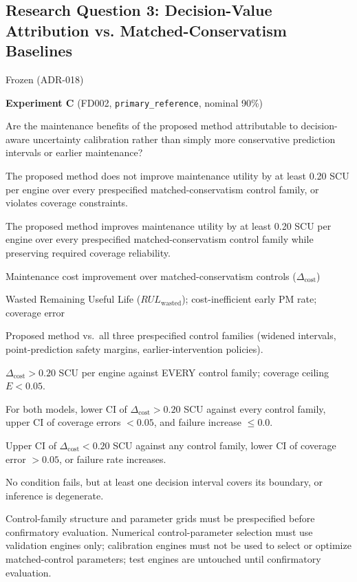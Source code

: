 \documentclass{article}
\begin{document}
\subsection*{Research Question 3: Decision-Value Attribution vs. Matched-Conservatism Baselines}
\begin{description}[style=multiline,leftmargin=3.5cm]
  \item[Status:] Frozen (ADR-018)
  \item[Experiment:] \textbf{Experiment C} (FD002, \texttt{primary\_reference}, nominal 90\%)
  \item[Question:] Are the maintenance benefits of the proposed method attributable to decision-aware uncertainty calibration rather than simply more conservative prediction intervals or earlier maintenance?
  \item[Null ($H_{0,3}$):] The proposed method does not improve maintenance utility by at least 0.20 SCU per engine over every prespecified matched-conservatism control family, or violates coverage constraints.
  \item[Alt ($H_{1,3}$):] The proposed method improves maintenance utility by at least 0.20 SCU per engine over every prespecified matched-conservatism control family while preserving required coverage reliability.
  \item[Primary Outcome:] Maintenance cost improvement over matched-conservatism controls ($\Delta_{\text{cost}}$)
  \item[Supporting Outcomes:] Wasted Remaining Useful Life ($RUL_{\text{wasted}}$); cost-inefficient early PM rate; coverage error
  \item[Comparison:] Proposed method vs.\ all three prespecified control families (widened intervals, point-prediction safety margins, earlier-intervention policies).
  \item[Threshold:] $\Delta_{\text{cost}} > 0.20$ SCU per engine against EVERY control family; coverage ceiling $E < 0.05$.
  \item[Supported Logic:] For both models, lower CI of $\Delta_{\text{cost}} > 0.20$ SCU against every control family, upper CI of coverage errors $< 0.05$, and failure increase $\le 0.0$.
  \item[Unsupported Logic:] Upper CI of $\Delta_{\text{cost}} < 0.20$ SCU against any control family, lower CI of coverage error $> 0.05$, or failure rate increases.
  \item[Inconclusive Logic:] No condition fails, but at least one decision interval covers its boundary, or inference is degenerate.
  \item[Control Selection:] Control-family structure and parameter grids must be prespecified before confirmatory evaluation. Numerical control-parameter selection must use validation engines only; calibration engines must not be used to select or optimize matched-control parameters; test engines are untouched until confirmatory evaluation.
\end{description}
\end{document}
